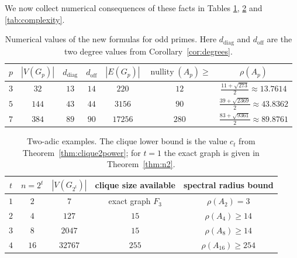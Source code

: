 \documentclass[12pt]{article}
\theoremstyle{definition}
\newcommand{\nullity}{\operatorname{nullity}}
\begin{document}
	We now collect numerical consequences of these facts in Tables \ref{tab:oddprimes}, \ref{tab:twopowers} and \ref{tab:complexity}.
	\begin{table}[H]
		\centering
		\caption{Numerical values of the new formulas for odd primes. Here $d_{\mathrm{diag}}$ and $d_{\mathrm{off}}$ are the two degree values from Corollary~\ref{cor:degrees}.}
		\label{tab:oddprimes}
		\begin{tabular}{ccccccc}
			\toprule
			$p$ & $|V(G_p)|$ & $d_{\mathrm{diag}}$ & $d_{\mathrm{off}}$ & $|E(G_p)|$ & $\nullity(A_p)\ge$ & $\rho(A_p)$ \\
			\midrule
			$3$ & $32$ & $13$ & $14$ & $220$ & $12$ & $\frac{11+\sqrt{273}}{2}\approx 13.7614$ \\
			$5$ & $144$ & $43$ & $44$ & $3156$ & $90$ & $\frac{39+\sqrt{2369}}{2}\approx 43.8362$ \\
			$7$ & $384$ & $89$ & $90$ & $17256$ & $280$ & $\frac{83+\sqrt{9361}}{2}\approx 89.8761$ \\
			\bottomrule
		\end{tabular}
	\end{table}
	
	\begin{table}[H]
		\centering
		\caption{Two-adic examples. The clique lower bound is the value $c_t$ from Theorem~\ref{thm:clique2power}; for $t=1$ the exact graph is given in Theorem~\ref{thm:n2}.}
		\label{tab:twopowers}
		\begin{tabular}{ccccc}
			\toprule
			$t$ & $n=2^t$ & $|V(G_{2^t})|$ & clique size available & spectral radius bound \\
			\midrule
			$1$ & $2$ & $7$ & exact graph $F_3$ & $\rho(A_2)=3$ \\
			$2$ & $4$ & $127$ & $15$ & $\rho(A_4)\ge 14$ \\
			$3$ & $8$ & $2047$ & $15$ & $\rho(A_8)\ge 14$ \\
			$4$ & $16$ & $32767$ & $255$ & $\rho(A_{16})\ge 254$ \\
			\bottomrule
		\end{tabular}
	\end{table}
	
\end{document}
